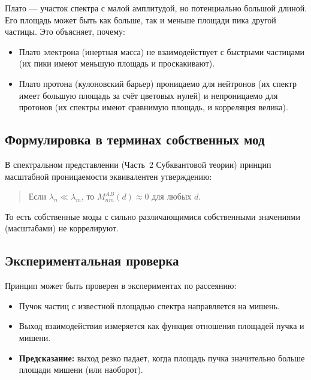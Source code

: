 \documentclass[12pt,a4paper]{article}
\begin{document}
Плато — участок спектра с малой амплитудой, но потенциально большой длиной. Его площадь может быть как больше, так и меньше площади пика другой частицы. Это объясняет, почему:

\begin{itemize}
    \item Плато электрона (инертная масса) не взаимодействует с быстрыми частицами (их пики имеют меньшую площадь и проскакивают).
    \item Плато протона (кулоновский барьер) проницаемо для нейтронов (их спектр имеет большую площадь за счёт цветовых нулей) и непроницаемо для протонов (их спектры имеют сравнимую площадь, и корреляция велика).
\end{itemize}

\subsection{Формулировка в терминах собственных мод}

В спектральном представлении (Часть~2 Субквантовой теории) принцип масштабной проницаемости эквивалентен утверждению:

\begin{quote}
Если $\lambda_n \ll \lambda_m$, то $M_{nm}^{AB}(d) \approx 0$ для любых $d$.
\end{quote}

То есть собственные моды с сильно различающимися собственными значениями (масштабами) не коррелируют.

\subsection{Экспериментальная проверка}

Принцип может быть проверен в экспериментах по рассеянию:

\begin{itemize}
    \item Пучок частиц с известной площадью спектра направляется на мишень.
    \item Выход взаимодействия измеряется как функция отношения площадей пучка и мишени.
    \item \textbf{Предсказание:} выход резко падает, когда площадь пучка значительно больше площади мишени (или наоборот).
\end{itemize}

\end{document}
